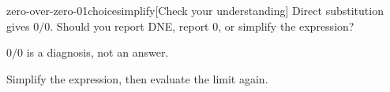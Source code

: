 \begin{bgcheck}{zero-over-zero-01}{choice}{simplify}[Check your understanding]
Direct substitution gives \(0/0\). Should you report DNE, report 0, or simplify the expression?
\begin{bghint}
\(0/0\) is a diagnosis, not an answer.
\end{bghint}
\begin{bgreveal}
Simplify the expression, then evaluate the limit again.
\end{bgreveal}
\end{bgcheck}
